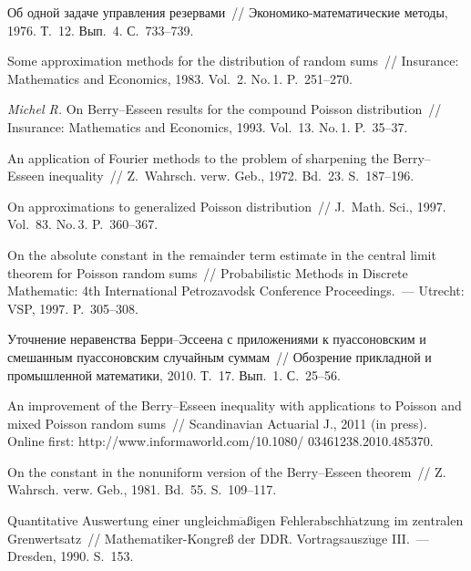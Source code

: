 \begin{multicols}{2}
{{\begin{thebibliography}{99}
 Об одной задаче управления резервами~//
Эко\-но\-ми\-ко-ма\-те\-ма\-ти\-че\-ские методы, 1976. Т.~12. Вып.~4. С.~733--739.

 Some approximation methods for the
distribution of random sums~// Insurance: Mathematics and Economics,
1983. Vol.~2. No.\,1. P.~251--270.

\textit{Michel R.} On Berry--Esseen results for the compound Poisson
distribution~// Insurance: Mathematics and Economics, 1993. Vol.~13. No.\,1. P.~35--37.

 An application of Fourier methods to the
problem of sharpening the Berry--Esseen inequality~// Z.~Wahrsch.
verw. Geb., 1972. Bd.~23. S.~187--196.

 On
approximations to generalized Poisson distribution~// J.\
Math. Sci., 1997. Vol.~83. No.\,3. P.~360--367.

 On the absolute constant in
the remainder term estimate in the central limit theorem for Poisson
random sums~// Probabilistic Methods in Discrete Mathematic:
4th International Petrozavodsk Conference Proceedings.~---
Utrecht: VSP, 1997. P.~305--308.

 Уточнение неравенства
Бер\-ри--Эс\-се\-ена с приложениями к пуассоновским и смешанным
пуассоновским случайным суммам~// Обозрение прикладной и
промышленной математики, 2010. Т.~17. Вып.~1. С.~25--56.

 An improvement of the
Berry--Esseen inequality with applications to Poisson and mixed
Poisson random sums~// Scandinavian Actuarial J., 2011 (in
press). Online first:
{\sf http://www.informaworld.com/10.1080/ 03461238.2010.485370}.

 On the constant in the nonuniform version of the
Berry--Esseen theorem~// Z. Wahrsch. verw. Geb., 1981. Bd.~55. S.~109--117.

 Quantitative Auswertung einer
ungleichm$\ddot{\mbox{a}}${\ss}igen Fehlerabschh$\ddot{\mbox{a}}$tzung im zentralen
Grenwertsatz~// Mathematiker-Kongre{\ss} der DDR.
Vortragsausz$\ddot{\mbox{u}}$ge III.~--- Dresden, 1990. S.~153.


\end{thebibliography}}}
\end{multicols}
